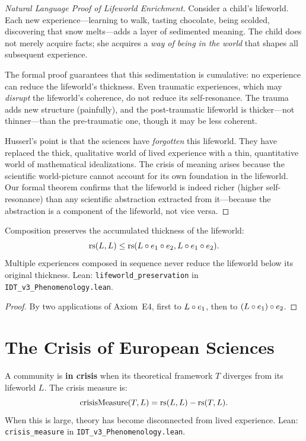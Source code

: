 \begin{proof}[Natural Language Proof of Lifeworld Enrichment]
Consider a child's lifeworld.  Each new experience---learning to walk,
tasting chocolate, being scolded, discovering that snow melts---adds a layer
of sedimented meaning.  The child does not merely acquire facts; she acquires
a \emph{way of being in the world} that shapes all subsequent experience.

The formal proof guarantees that this sedimentation is cumulative: no experience
can reduce the lifeworld's thickness.  Even traumatic experiences, which may
\emph{disrupt} the lifeworld's coherence, do not reduce its self-resonance.
The trauma adds new structure (painfully), and the post-traumatic lifeworld
is thicker---not thinner---than the pre-traumatic one, though it may be less
coherent.

Husserl's point is that the sciences have \emph{forgotten} this lifeworld.
They have replaced the thick, qualitative world of lived experience with a
thin, quantitative world of mathematical idealizations.  The crisis of meaning
arises because the scientific world-picture cannot account for its own
foundation in the lifeworld.  Our formal theorem confirms that the lifeworld
is indeed richer (higher self-resonance) than any scientific abstraction
extracted from it---because the abstraction is a component of the lifeworld,
not vice versa.
\end{proof}

\begin{theorem}
\label{thm:lifeworld-preservation}
Composition preserves the accumulated thickness of the lifeworld:
\[
\mathrm{rs}(L, L) \leq \mathrm{rs}(L \circ e_1 \circ e_2, L \circ e_1 \circ e_2).
\]
Multiple experiences composed in sequence never reduce the lifeworld below
its original thickness.
Lean: \texttt{lifeworld\_preservation} in \texttt{IDT\_v3\_Phenomenology.lean}.
\end{theorem}

\begin{proof}
By two applications of Axiom~E4, first to $L \circ e_1$, then to
$(L \circ e_1) \circ e_2$.
\end{proof}

\section{The Crisis of European Sciences}

\begin{definition}
\label{def:crisis-measure}
A community is \textbf{in crisis} when its theoretical framework $T$ diverges
from its lifeworld $L$.  The crisis measure is:
\[
\mathrm{crisisMeasure}(T, L) = \mathrm{rs}(L, L) - \mathrm{rs}(T, L).
\]
When this is large, theory has become disconnected from lived experience.
Lean: \texttt{crisis\_measure} in \texttt{IDT\_v3\_Phenomenology.lean}.
\end{definition}

